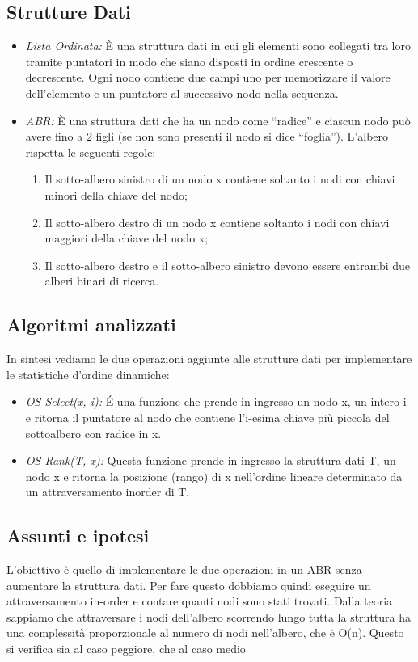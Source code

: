 \documentclass{article}
\begin{document}
\subsection{Strutture Dati}
\begin{itemize}
    \item \textit  {Lista Ordinata:}
    \`E una struttura dati in cui gli elementi sono collegati tra loro tramite puntatori in modo che siano disposti in ordine crescente o decrescente. Ogni nodo contiene due campi uno per memorizzare il valore dell'elemento e un puntatore al successivo nodo nella sequenza.
    
    \item \textit {ABR:} 
    \`E una struttura dati che ha un nodo come ``radice'' e ciascun nodo può avere fino a 2 figli (se non sono presenti il nodo si dice ``foglia''). L'albero rispetta le seguenti regole:
    \begin{enumerate}
    \item Il sotto-albero sinistro di un nodo x contiene soltanto i nodi con chiavi minori della chiave del nodo;
    \item Il sotto-albero destro di un nodo x contiene soltanto i nodi con chiavi maggiori della chiave del nodo x;
    \item Il sotto-albero destro e il sotto-albero sinistro devono essere entrambi due alberi binari di ricerca.
    \end{enumerate}
    
\end{itemize}
\subsection{Algoritmi analizzati}
In sintesi vediamo le due operazioni aggiunte alle strutture dati per implementare le statistiche d'ordine dinamiche:
\begin{itemize}
    \item \textit  {OS-Select(x, i):} 
    \' E una funzione che prende in ingresso un nodo  x, un intero i e ritorna il puntatore al nodo che contiene l’i-esima chiave più piccola del sottoalbero con radice in x. 
    
    \item \textit {OS-Rank(T, x):} 
    Questa funzione prende in ingresso la struttura dati T, un nodo x e ritorna la posizione (rango) di x nell’ordine lineare determinato da un attraversamento inorder di T.
\end{itemize}

\subsection{Assunti e ipotesi}
L'obiettivo è quello di implementare le due operazioni in un ABR senza aumentare la struttura dati.
Per fare questo dobbiamo quindi eseguire un attraversamento in-order e contare quanti nodi sono stati trovati.
Dalla teoria sappiamo che attraversare i nodi dell'albero scorrendo lungo tutta la struttura ha una complessità proporzionale al numero di nodi nell'albero, che è O(n).
Questo si verifica sia al caso peggiore, che al caso medio
\end{document}
